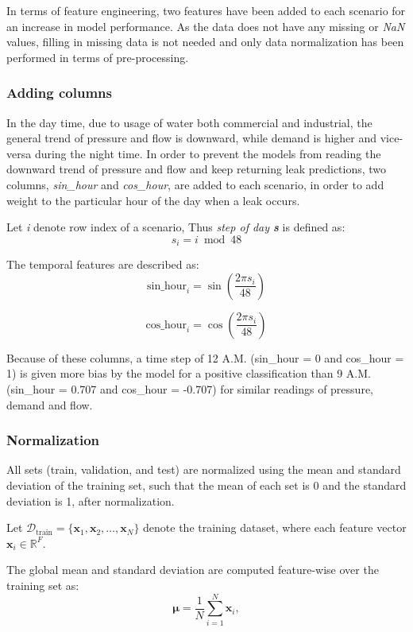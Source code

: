 \documentclass[final,5p,times,twocolumn,authoryear]{elsarticle}
\begin{document}
In terms of feature engineering, two features have been added to each scenario for an increase in model performance. As the data does not have any missing or \textit{NaN} values, filling in missing data is not needed and only data normalization has been performed in terms of pre-processing.

\subsubsection{Adding columns}

In the day time, due to usage of water both commercial and industrial, the general trend of pressure and flow is downward, while demand is higher and vice-versa during the night time. In order to prevent the models from reading the downward trend of pressure and flow and keep returning leak predictions, two columns, \textit{sin\_hour} and \textit{cos\_hour}, are added to each scenario, in order to add weight to the particular hour of the day when a leak occurs. 

Let \textit{i} denote row index of a scenario, Thus \textit{step of day \textbf{s}} is defined as:
\[
s_i = i \bmod 48
\]

The temporal features are described as:
\[
\text{sin\_hour}_i = \sin\!\left( \frac{2\pi s_i}{48} \right)
\]

\[
\text{cos\_hour}_i = \cos\!\left( \frac{2\pi s_i}{48} \right)
\]

Because of these columns, a time step of 12 A.M. (sin\_hour = 0 and cos\_hour = 1) is given more bias by the model for a positive classification than 9 A.M. (sin\_hour = 0.707 and cos\_hour = -0.707) for similar readings of pressure, demand and flow.

\subsubsection{Normalization}

All sets (train, validation, and test) are normalized using the mean and standard deviation of the training set, such that the mean of each set is 0 and the standard deviation is 1, after normalization.

\vspace{0.05cm}

Let $\mathcal{D}_{\text{train}} = \{\mathbf{x}_1, \mathbf{x}_2, \dots, \mathbf{x}_N\}$
denote the training dataset, where each feature vector
$\mathbf{x}_i \in \mathbb{R}^{F}$.

The global mean and standard deviation are computed feature-wise over the
training set as:
\begin{equation}
\boldsymbol{\mu} =
\frac{1}{N} \sum_{i=1}^{N} \mathbf{x}_i,
\end{equation}
\end{document}
